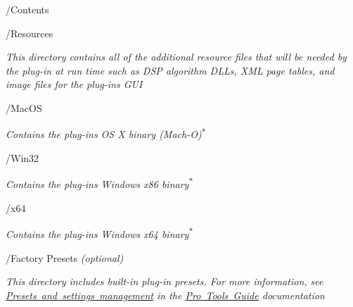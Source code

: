 \begin{DoxyItemize}
\item /\+Contents 
\begin{DoxyItemize}
\item /\+Resources 
\begin{DoxyItemize}
\item {\itshape This directory contains all of the additional resource files that will be needed by the plug-\/in at run time such as D\+SP algorithm D\+L\+Ls, X\+ML page tables, and image files for the plug-\/in\textquotesingle{}s G\+UI}  
\end{DoxyItemize}
\end{DoxyItemize}
\begin{DoxyItemize}
\item /\+Mac\+OS 
\begin{DoxyItemize}
\item {\itshape Contains the plug-\/in\textquotesingle{}s OS X binary (Mach-\/O)\textsuperscript{$\ast$}}  
\end{DoxyItemize}
\end{DoxyItemize}
\begin{DoxyItemize}
\item /\+Win32 
\begin{DoxyItemize}
\item {\itshape Contains the plug-\/in\textquotesingle{}s Windows x86 binary\textsuperscript{$\ast$}}  
\end{DoxyItemize}
\end{DoxyItemize}
\begin{DoxyItemize}
\item /x64 
\begin{DoxyItemize}
\item {\itshape Contains the plug-\/in\textquotesingle{}s Windows x64 binary\textsuperscript{$\ast$}}  
\end{DoxyItemize}
\end{DoxyItemize}
\begin{DoxyItemize}
\item /\+Factory Presets {\itshape (optional) } 
\begin{DoxyItemize}
\item {\itshape This directory includes built-\/in plug-\/in presets. For more information, see \mbox{\hyperlink{a00830_subsection__presets_and_settings_management}{Presets and settings management}} in the \mbox{\hyperlink{a00830}{Pro Tools Guide}} documentation}  
\end{DoxyItemize}
\end{DoxyItemize}

\end{DoxyItemize}
